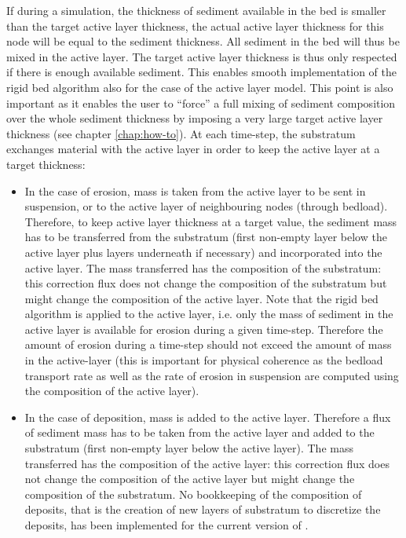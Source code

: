 If during a simulation, the thickness of sediment available in the bed is smaller than the target active layer thickness, the actual active layer thickness for this node will be equal to the sediment thickness. All sediment in the bed will thus be mixed in the active layer. The target active layer thickness is thus only respected if there is enough available sediment. This enables smooth implementation of the rigid bed algorithm also for the case of the active layer model. This point is also important as it enables the user to ``force'' a full mixing of sediment composition over the whole sediment thickness by imposing a very large target active layer thickness (see chapter \ref{chap:how-to}). At each time-step, the substratum exchanges material with the active layer in order to keep the active layer at a target thickness:

\begin{itemize}
\item In the case of erosion, mass is taken from the active layer to be sent in suspension, or to the active layer of neighbouring nodes (through bedload). Therefore, to keep active layer thickness at a target value, the sediment mass has to be transferred from the substratum (first non-empty layer below the active layer plus layers underneath if necessary) and incorporated into the active layer. The mass transferred has the composition of the substratum: this correction flux does not change the composition of the substratum but might change the composition of the active layer. Note that the rigid bed algorithm is applied to the active layer, i.e. only the mass of sediment in the active layer is available for erosion during a given time-step. Therefore the amount of erosion during a time-step should not exceed the amount of mass in the active-layer (this is important for physical coherence as the bedload transport rate as well as the rate of erosion in suspension are computed using the composition of the active layer).

\item In the case of deposition, mass is added to the active layer. Therefore a flux of sediment mass has to be taken from the active layer and added to the substratum (first non-empty layer below the active layer). The mass transferred has the composition of the active layer: this correction flux does not change the composition of the active layer but might change the composition of the substratum. No bookkeeping of the composition of deposits, that is the creation of new layers of substratum to discretize the deposits, has been implemented for the current version of \gaia{}.
\end{itemize}

